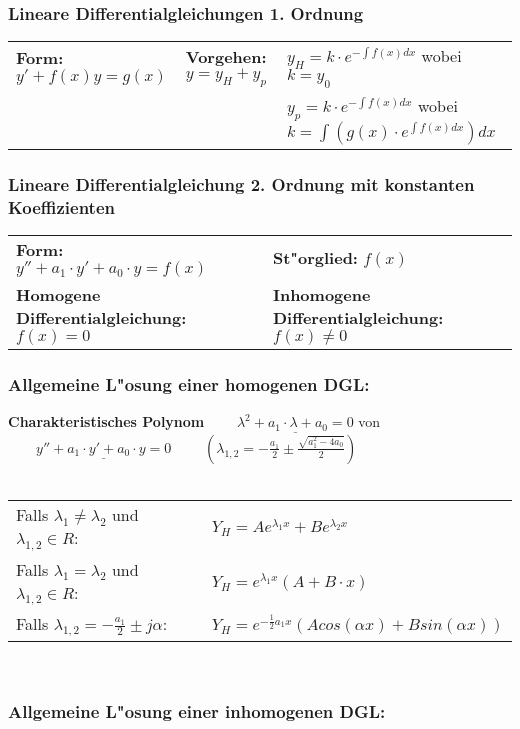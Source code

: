 	\subsubsection{Lineare Differentialgleichungen 1. Ordnung}
	\begin{tabular}{lll}
	\textbf{Form:} $ y'+f(x)y = g(x) $ &
	\textbf{Vorgehen:} $y=y_H+y_p$ &
	$y_H=k \cdot e^{-\int f(x) dx}$ wobei $k=y_0$\\ & &
	$y_p=k \cdot e^{-\int f(x) dx}$ wobei $k=\int(g(x) \cdot e^{\int f(x) dx}) dx$
	\end{tabular}
	
	\subsubsection{Lineare Differentialgleichung 2. Ordnung mit konstanten 
	Koeffizienten}
	\begin{tabular}{p{8cm}p{8cm}}
	\textbf{Form:} $y''+a_1\cdot y'+a_0\cdot y=f(x)$  &
	\textbf{St"orglied:} $f(x)$\\
	\textbf{Homogene Differentialgleichung:} $f(x)=0$ &
	\textbf{Inhomogene Differentialgleichung:} $f(x)\neq 0$
	\end{tabular}
	
	\subsubsection{Allgemeine L"osung einer homogenen DGL:\quad\subsubadd{$\quad Y_H$}}
	\textbf{Charakteristisches Polynom}
	$\qquad\underline{\lambda^2+a_1\cdot\lambda+a_0=0}$ \hspace{1cm}von
	$\qquad\underline{y''+a_1\cdot y'+a_0\cdot y=0}$ 
	$\qquad(\lambda_{1,2} = -\frac{a_1}{2} \pm \frac{\sqrt{a_1^2 - 4a_0}}{2})$\\ \\
	\begin{tabular}{p{8cm}p{8cm}}
	Falls $\lambda_1\neq \lambda_2$ und $\lambda_{1,2} \in R$:&
	$Y_H=Ae^{\lambda_1x}+Be^{\lambda_2x}$\\
	Falls $\lambda_1=\lambda_2$ und $\lambda_{1,2} \in R$:    &
	$Y_H=e^{\lambda_1x}(A+B\cdot x)$\\
	Falls $\lambda_{1,2}=-\frac{a_1}{2}\pm j\alpha$:          &
	$Y_H=e^{-\frac{1}{2}a_1x}(Acos(\alpha x) +Bsin(\alpha x))$\\
	\end{tabular}\\
	
	\subsubsection{Allgemeine L"osung einer inhomogenen DGL:\quad{}}
	
